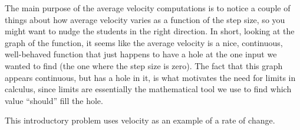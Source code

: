 The main purpose of the average velocity computations is to notice a couple of things about how average velocity varies as a function of the step size, so you might want to nudge the students in the right direction. In short, looking at the graph of the function, it seems like the average velocity is a nice, continuous, well-behaved function that just happens to have a hole at the one input we wanted to find (the one where the step size is zero). The fact that this graph appears continuous, but has a hole in it, is what motivates the need for limits in calculus, since limits are essentially the mathematical tool we use to find which value ``should'' fill the hole.

This introductory problem uses velocity as an example of a rate of change.


